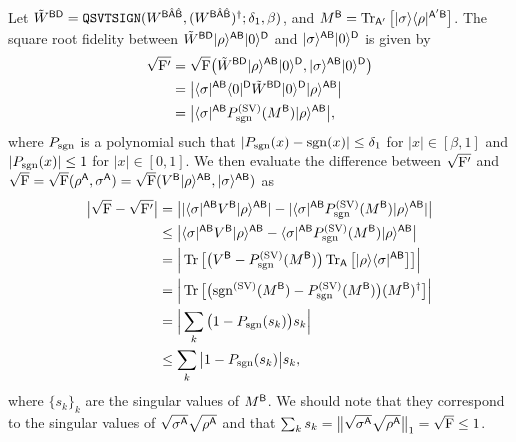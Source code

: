 Let $\til{W}^{\sB\sD} = \mathtt{QSVTSIGN}(W^{\sB\hat{\sA}\hat{\sB}}, (W^{\sB\hat{\sA}\hat{\sB}})^\dag; \delta_1, \beta)$, and $M^\sB = \tr_{\sA'}\big[\ketbra{\sigma}{\rho}^{\sA'\sB}\big]$.
The square root fidelity between $\til{W}^{\sB\sD}\ket{\rho}^{\sA\sB}\ket{0}^{\sD}$ and $\ket{\sigma}^{\sA\sB}\ket{0}^{\sD}$ is given by 
\begin{align}
\label{inteq:14}
    \sqrt{\rF'} &=\sqrt{\rF}\big(\til{W}^{\sB\sD}\ket{\rho}^{\sA\sB}\ket{0}^{\sD}, \ket{\sigma}^{\sA\sB}\ket{0}^{\sD}\big) \\
    &= \big|\bra{\sigma}^{\sA\sB}\bra{0}^{\sD}\til{W}^{\sB\sD}\ket{0}^{\sD}\ket{\rho}^{\sA\sB}\big| \\
    &= \big|\bra{\sigma}^{\sA\sB}P_\sgn^{(\rm SV)}(M^\sB)\ket{\rho}^{\sA\sB}\big|,
\end{align}
where $P_\sgn$ is a polynomial such that $|P_\sgn(x) - \sgn(x)| \leq \delta_1$ for $|x| \in [\beta, 1]$ and $|P_\sgn(x)| \leq 1$ for $|x| \in [0, 1]$.
We then evaluate the difference between $\sqrt{\rF'}$ and $\sqrt{\rF} = \sqrt{\rF}(\rho^\sA, \sigma^\sA) = \sqrt{\rF}(V^\sB\ket{\rho}^{\sA\sB}, \ket{\sigma}^{\sA\sB})$ as
\begin{align}
    \label{inteq:104}
    \big|\sqrt{\rF} - \sqrt{\rF'}\big| 
    &= \big||\bra{\sigma}^{\sA\sB}V^\sB\ket{\rho}^{\sA\sB}| - |\bra{\sigma}^{\sA\sB}P_\sgn^{(\rm SV)}(M^\sB)\ket{\rho}^{\sA\sB}| \big| \\
    &\leq \big| \bra{\sigma}^{\sA\sB}V^\sB\ket{\rho}^{\sA\sB} - \bra{\sigma}^{\sA\sB}P_\sgn^{(\rm SV)}(M^\sB)\ket{\rho}^{\sA\sB} \big| \\
    &= \Big|\tr\big[\big(V^\sB - P_\sgn^{(\rm SV)}(M^\sB)\big)\tr_{\sA}\big[\ketbra{\rho}{\sigma}^{\sA\sB}\big]\big]\Big| \\
    &= \Big|\tr\big[\big(\sgn^{(\rm SV)}(M^\sB) - P_\sgn^{(\rm SV)}(M^\sB)\big)(M^{\sB})^\dag\big]\Big| \\
    &= \Big|\sum_k \big(1 - P_\sgn(s_k)\big)s_k\Big| \\
    \label{inteq:8}
    &\leq \sum_k \big|1 - P_\sgn(s_k)\big|s_k,
\end{align}
where $\{s_k\}_k$ are the singular values of $M^\sB$.
We should note that they correspond to the singular values of $\sqrt{\sigma^\sA}\sqrt{\rho^\sA}$ and that $\sum_k s_k = \big\|\sqrt{\sigma^\sA}\sqrt{\rho^\sA}\big\|_1 = \sqrt{\rF} \leq 1$.




